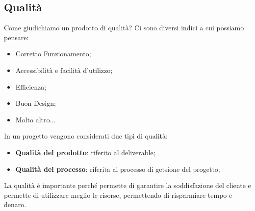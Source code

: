 \subsection{Qualità}
Come giudichiamo un prodotto di qualità? Ci sono diversi indici a cui possiamo pensare:
\begin{itemize}
	\item Corretto Funzionamento;
	\item Accessibilità e facilità d'utilizzo;
	\item Efficienza;
	\item Buon Design;
	\item Molto altro...
\end{itemize}
In un progetto vengono considerati due tipi di qualità:
\begin{itemize}
	\item \textbf{Qualità del prodotto}: riferito al deliverable;
	\item \textbf{Qualità del processo}: riferita al processo di getsione del progetto;
\end{itemize}
La qualità è importante perché permette di garantire la soddisfazione del cliente e permette di utilizzare meglio le risorse, permettendo di risparmiare tempo e denaro.
